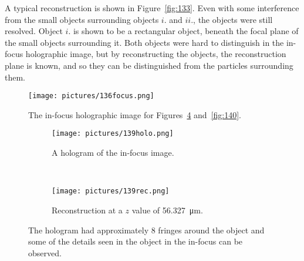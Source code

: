 A typical reconstruction is shown in Figure~\ref{fig:133}. Even with some
interference from the small objects surrounding objects $i.$ and $ii.$, the
objects were still resolved. Object $i.$ is shown to be a rectangular object,
beneath the focal plane of the small objects surrounding it. Both objects were
hard to distinguish in the in-focus holographic image, but by reconstructing
the objects, the reconstruction plane is known, and so they can be
distinguished from the particles surrounding them.


\begin{figure}
\begin{center}
    \texttt{[image: pictures/136focus.png]}
    \caption{The in-focus holographic image for Figures~\ref{fig:139} and~\ref{fig:140}. }
    \label{fig:136focus}
\end{center}
\end{figure}


\begin{figure}[ht!]
    \begin{center}

        \begin{subfigure}[t]{0.4\textwidth}
            \label{fig:139holo}
            \texttt{[image: pictures/139holo.png]}
            \caption{A hologram of the in-focus image.}
        \end{subfigure}
        \\
        \begin{subfigure}[t]{\textwidth}
            \label{fig:139rec}
            \texttt{[image: pictures/139rec.png]}
            \caption{Reconstruction at a $z$ value of
                \SI{56.327}{\micro\meter}.}
        \end{subfigure}


    \end{center}
    \caption{%
        The hologram had approximately 8 fringes around the object and
        some of the details seen in the object in the in-focus can be observed.
    }%
    \label{fig:139}
\end{figure}


